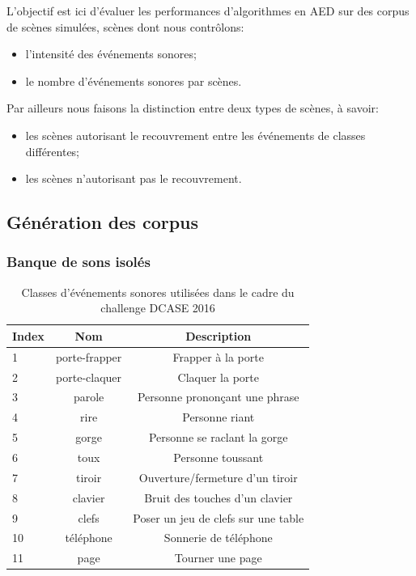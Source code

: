 L'objectif est ici d'évaluer les performances d'algorithmes en AED sur des corpus de scènes simulées, scènes dont nous contrôlons:

\begin{itemize}
\item l'intensité des événements sonores;
\item le nombre d'événements sonores par scènes.
\end{itemize}

Par ailleurs nous faisons la distinction entre deux types de scènes, à savoir:

\begin{itemize}
\item les scènes autorisant le recouvrement entre les événements de classes différentes;
\item les scènes n'autorisant pas le recouvrement.
\end{itemize}

\subsection{Génération des corpus}

\subsubsection{Banque de sons isolés}

\begin{table}[t]
\begin{center}
\begin{tabular}{lcc}
\textbf{Index} & \textbf{Nom}  & \textbf{Description}  \\ 
\hline
1   & porte-frapper & Frapper à la porte \\
2   & porte-claquer & Claquer la porte \\
3   & parole        & Personne  prononçant une phrase \\
4   & rire          & Personne riant  \\    
5   & gorge         & Personne se raclant la gorge  \\
6   & toux          & Personne toussant \\
7   & tiroir        & Ouverture/fermeture d'un tiroir \\
8   & clavier       & Bruit des touches d'un clavier \\
9   & clefs         & Poser un jeu de clefs sur une table \\    
10  & téléphone     & Sonnerie de téléphone \\
11  & page          & Tourner une page \\     
\hline      
\end{tabular}
\end{center}
\caption{Classes d'événements sonores utilisées dans le cadre du challenge DCASE 2016}
\label{tab:eventDCASE2016}
\end{table}

